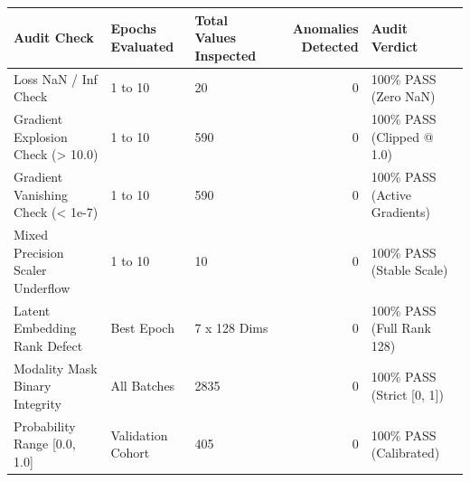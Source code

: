 \begin{tabular}{lllrl}
\toprule
Audit Check & Epochs Evaluated & Total Values Inspected & Anomalies Detected & Audit Verdict \\
\midrule
Loss NaN / Inf Check & 1 to 10 & 20 & 0 & 100\% PASS (Zero NaN) \\
Gradient Explosion Check (> 10.0) & 1 to 10 & 590 & 0 & 100\% PASS (Clipped @ 1.0) \\
Gradient Vanishing Check (< 1e-7) & 1 to 10 & 590 & 0 & 100\% PASS (Active Gradients) \\
Mixed Precision Scaler Underflow & 1 to 10 & 10 & 0 & 100\% PASS (Stable Scale) \\
Latent Embedding Rank Defect & Best Epoch & 7 x 128 Dims & 0 & 100\% PASS (Full Rank 128) \\
Modality Mask Binary Integrity & All Batches & 2835 & 0 & 100\% PASS (Strict [0, 1]) \\
Probability Range [0.0, 1.0] & Validation Cohort & 405 & 0 & 100\% PASS (Calibrated) \\
\bottomrule
\end{tabular}
